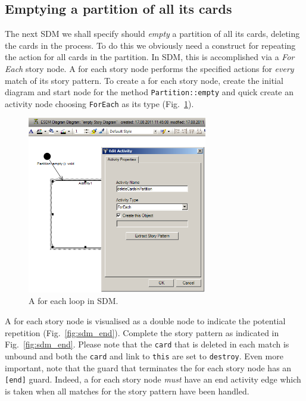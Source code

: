 \subsection{Emptying a partition of all its cards}
\label{sec:empty}

The next SDM we shall specify should \emph{empty} a partition of all its cards,
deleting the cards in the process.  To do this we obviously need a construct for
repeating the action for all cards in the partition.  In SDM, this is
accomplished via a \emph{For Each} story node.  A for each story node performs
the specified actions for \emph{every} match of its story pattern.  To create a
for each story node, create the initial diagram and start node for the method
\texttt{Partition::empty} and quick create an activity node choosing
\texttt{ForEach} as its type (Fig.~\ref{fig:sdm_foreach}).

\begin{figure}[htbp]
\begin{center}
  \includegraphics[width=0.7\textwidth]{pics/sdmBilder/empty/sdm42RAW}
  \caption{A for each loop in SDM.}  
  \label{fig:sdm_foreach}
\end{center}
\end{figure}

A for each story node is visualised as a double node to indicate the
potential repetition (Fig.~\ref{fig:sdm_end}). Complete the story pattern as
indicated in Fig.~\ref{fig:sdm_end}.  Please note that the \texttt{card} that is
deleted in each match is unbound and both the \texttt{card} and link to
\texttt{this} are set to \texttt{destroy}.  Even more important, note that the
guard that terminates the for each story node has an \texttt{[end]} guard. 
Indeed, a for each story node \emph{must} have an end activity edge which is
taken when all matches for the story pattern have been handled.

